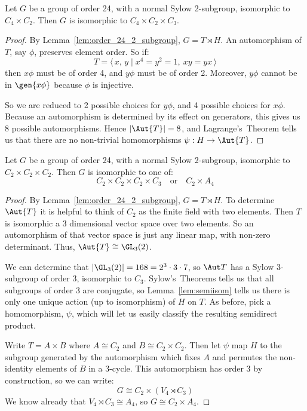 \begin{lemma}
    Let \(G\) be a group of order 24, with a normal Sylow 2-subgroup, isomorphic to \(C_4 \times C_{2}\).
    Then \(G\) is isomorphic to \(C_4 \times C_2 \times C_3\).
\end{lemma}

\begin{proof}
    By Lemma~\ref{lem:order_24_2_subgroup}, \(G = T \rtimes H\).
    An automorphism of \(T\), say \(\phi\), preserves element order.
    So if:
    \[T = \langle\,x,\,y \mid x^4 = y^2 = 1,\ xy = yx\,\rangle\]
    then \(x\phi\) must be of order 4, and \(y\phi\) must be of order 2.
    Moreover, \(y\phi\) cannot be in \(\gen{x\phi}\) because \(\phi\) is injective.

    So we are reduced to 2 possible choices for \(y\phi\), and 4 possible choices for \(x\phi\).
    Because an automorphism is determined by its effect on generators, this gives us 8 possible automorphisms.
    Hence \(|\Aut{T}| = 8\), and Lagrange's~Theorem tells us that there are no non-trivial homomorphisms \(\psi:H
    \to \Aut{T}\).
\end{proof}

\begin{lemma}
    Let \(G\) be a group of order 24, with a normal Sylow 2-subgroup, isomorphic to \(C_{2} \times C_2 \times C_{2}\).
    Then \(G\) is isomorphic to one of:
    \[
        C_2 \times C_2 \times C_2 \times C_3 \quad \text{or} \quad%
        C_2 \times A_4
    \]
\end{lemma}

\begin{proof}
    By Lemma~\ref{lem:order_24_2_subgroup}, \(G = T \rtimes H\).
    To determine \(\Aut{T}\) it is helpful to think of \(C_2\) as the finite field with two elements.
    Then \(T\) is isomorphic a 3 dimensional vector space over two elements.
    So an automorphism of that vector space is just any linear map, with non-zero determinant.
    Thus, \(\Aut{T} \cong \GL_3(2)\).

    We can determine that \(|\GL_3(2)| = 168 = 2^3 \cdot 3 \cdot 7\), so \(\Aut T\) has a Sylow 3-subgroup of order
    3, isomorphic to \(C_3\).
    Sylow's~Theorems tells us that all subgroups of order 3 are conjugate, so Lemma~\ref{lem:semiisom} tells us
    there is only one unique action (up to isomorphism) of \(H\) on \(T\).
    As before, pick a homomorphism, \(\psi\), which will let us easily classify the resulting semidirect product.

    Write \(T = A \times B\) where \(A \cong C_2\) and \(B \cong C_2 \times C_2\).
    Then let \(\psi\) map \(H\) to the subgroup generated by the automorphism which fixes \(A\) and permutes the
    non-identity elements of \(B\) in a 3-cycle.
    This automorphism has order 3 by construction, so we can write:
    \[G \cong C_2 \times (V_4 \rtimes C_3)\]
    We know already that \(V_4 \rtimes C_3 \cong A_4\), so \(G \cong C_2 \times A_4\).
\end{proof}

